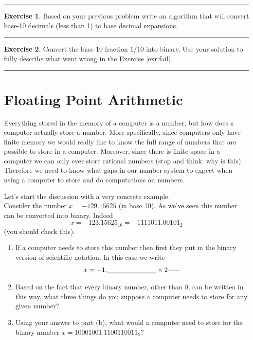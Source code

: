 \documentclass[
]{book}
\theoremstyle{definition}
\theoremstyle{definition}
\theoremstyle{definition}
\newtheorem{exercise}{Exercise}[chapter]
\theoremstyle{remark}
\begin{document}
\begin{center}\rule{0.5\linewidth}{0.5pt}\end{center}

\begin{exercise}
\protect\hypertarget{exr:unnamed-chunk-19}{}{\label{exr:unnamed-chunk-19} }Based on your previous problem write an algorithm that will convert
base-10 decimals (less than 1) to base decimal expansions.
\end{exercise}

\begin{center}\rule{0.5\linewidth}{0.5pt}\end{center}

\begin{exercise}
\protect\hypertarget{exr:unnamed-chunk-20}{}{\label{exr:unnamed-chunk-20} }Convert the base 10 fraction \(1/10\) into binary. Use your solution to
fully describe what went wrong in the Exercise \ref{exr:fail}.
\end{exercise}

\begin{center}\rule{0.5\linewidth}{0.5pt}\end{center}

\hypertarget{floating-point-arithmetic}{%
\section{Floating Point Arithmetic}\label{floating-point-arithmetic}}

Everything stored in the memory of a computer is a number, but how does
a computer actually store a number. More specifically, since computers
only have finite memory we would really like to know the full range of
numbers that are possible to store in a computer. Moreover, since there is finite space in a computer we can only ever store rational numbers (stop and think: why is this). Therefore we need to know what gaps in our number system to expect when using a computer to store and do computations on numbers.

Let's start the discussion with a very concrete example.\\
Consider the number \(x = -129.15625\) (in base 10). As we've seen this
number can be converted into binary. Indeed
\[x = -123.15625_{10} = -1111011.00101_2\] (you should check this).

\begin{enumerate}
\def\labelenumi{\arabic{enumi}.}
\item
  If a computer needs to store this number then first they put in the
  binary version of scientific notation. In this case we write
  \[x = -1. \underline{\hspace{1in}} \times 2^{\underline{\hspace{0.25in}}}\]
\item
  Based on the fact that every binary number, other than 0, can be
  written in this way, what three things do you suppose a computer
  needs to store for any given number?
\item
  Using your answer to part (b), what would a computer need to store
  for the binary number \(x=10001001.1100110011_2\)?
\end{enumerate}
\end{document}
